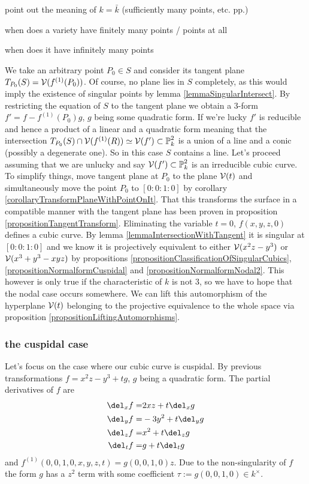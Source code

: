 \begin{todo}
\item point out the meaning of $k=\bar k$ (sufficiently many points, etc. pp.)
\item when does a variety have finitely many points / points at all
\item when does it have infinitely many points
\end{todo}
We take an arbitrary point $P_0 \in S$ and consider its tangent plane $T_{P_0}(S) = \operatorname{\mathcal V}(f^{(1)}(P_0))$.
Of course, no plane lies in $S$ completely, as this would imply the existence of singular points by lemma \ref{lemmaSingularIntersect}.
By restricting the equation of $S$ to the tangent plane we obtain a 3-form $f' = f - f^{(1)}(P_0)g$, $g$ being some quadratic form.
If we're lucky $f'$ is reducible and hence a product of a linear and a quadratic form meaning that the intersection $T_{P_0}(S) \cap \operatorname{\mathcal V}(f^{(1)}(R)) \simeq \operatorname{\mathcal V}(f') \subset \operatorname{\mathbb P}^2_k$ is a union of a line and a conic (possibly a degenerate one).
So in this case $S$ contains a line.
Let's proceed assuming that we are unlucky and say $\operatorname{\mathcal V}(f') \subset \operatorname{\mathbb P}^2_k$ is an irreducible cubic curve.
To simplify things, move tangent plane at $P_0$ to the plane $\operatorname{\mathcal V}(t)$ and simultaneously move the point $P_0$ to $[0:0:1:0]$ by corollary \ref{corollaryTransformPlaneWithPointOnIt}.
That this transforms the surface in a compatible manner with the tangent plane has been proven in proposition \ref{propositionTangentTransform}.
Eliminating the variable $t = 0$, $f(x,y,z,0)$ defines a cubic curve.
By lemma \ref{lemmaIntersectionWithTangent} it is singular at $[0:0:1:0]$ and we know it is projectively equivalent to either $\operatorname{\mathcal V}(x^2z - y^3)$ or $\operatorname{\mathcal V}(x^3 + y^3 - xyz)$ by propositions \ref{propositionClassificationOfSingularCubics}, \ref{propositionNormalformCuspidal} and \ref{propositionNormalformNodal2}.
This however is only true if the characteristic of $k$ is not $3$, so we have to hope that the nodal case occurs somewhere.
We can lift this automorphism of the hyperplane $\operatorname{\mathcal V}(t)$ belonging to the projective equivalence to the whole space via proposition \ref{propositionLiftingAutomorphisms}.

\subsubsection{the cuspidal case}
Let's focus on the case where our cubic curve is cuspidal. By previous transformations $f = x^2z - y^3 + tg$, $g$ being a quadratic form.
The partial derivatives of $f$ are
\begin{align}
   \del_x f =& 2xz + t\del_x g
\\ \del_y f =& -3y^2 + t\del_y g
\\ \del_z f =& x^2 + t\del_z g
\\ \del_t f =& g + t\del_t g
\end{align}
and $f^{(1)}(0,0,1,0,x,y,z,t) = g(0,0,1,0)z$.
Due to the non-singularity of $f$ the form $g$ has a $z^2$ term with some coefficient $\tau := g(0,0,1,0) \in k^\times$.

